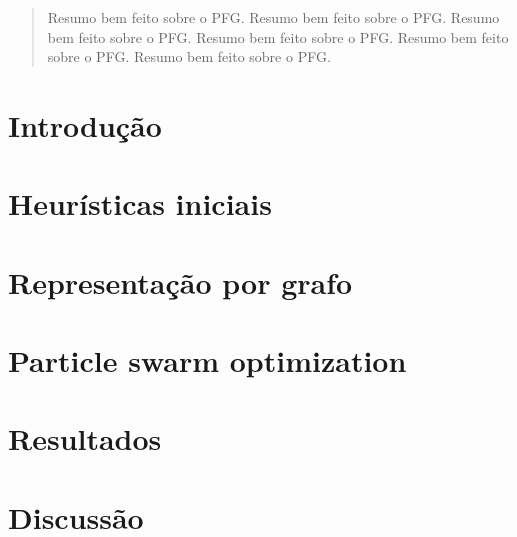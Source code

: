 \documentclass[11pt,twoside]{article}
\begin{document}

    \begin{abstract}
        Resumo bem feito sobre o PFG. Resumo bem feito sobre o PFG. Resumo bem feito sobre o PFG. Resumo bem feito sobre o PFG. Resumo bem feito sobre o PFG. Resumo bem feito sobre o PFG.
    \end{abstract}

    \section{Introdução}

        

    \section{Heurísticas iniciais}

        

    \section{Representação por grafo}

        

    \section{Particle swarm optimization}

        

    \section{Resultados}

    \section{Discussão}

    \newpage
    \printbibliography
\end{document}
